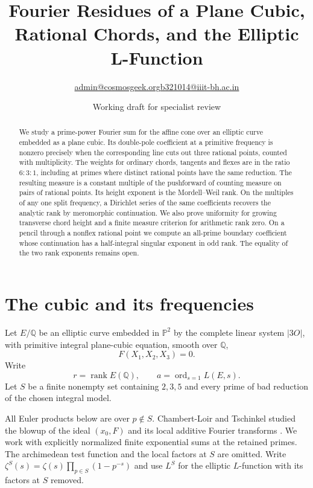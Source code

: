 \documentclass[11pt]{article}
\title{Fourier Residues of a Plane Cubic, Rational Chords, and the Elliptic L-Function}
\author{\small \href{mailto:admin@cosmosgeek.org}{admin@cosmosgeek.org}\qquad \href{mailto:b321014@iiit-bh.ac.in}{b321014@iiit-bh.ac.in}}
\date{Working draft for specialist review}
\begin{document}
\maketitle

\begin{abstract}
We study a prime-power Fourier sum for the affine cone over an elliptic
curve embedded as a plane cubic. Its double-pole coefficient at a
primitive frequency is nonzero precisely when the corresponding line
cuts out three rational points, counted with multiplicity. The weights
for ordinary chords, tangents and flexes are in the ratio $6:3:1$,
including at primes where distinct rational points have the same
reduction. The resulting measure is a constant multiple of the
pushforward of counting measure on pairs of rational points. Its
height exponent is the Mordell--Weil rank. On the multiples of any
one split frequency, a Dirichlet series of the same coefficients
recovers the analytic rank by meromorphic continuation. We also
prove uniformity for growing transverse chord height and a finite
measure criterion for arithmetic rank zero. On a pencil through a nonflex
rational point we compute an all-prime boundary coefficient whose continuation
has a half-integral singular exponent in odd rank. The equality of the two
rank exponents remains open.
\end{abstract}

\section{The cubic and its frequencies}

Let $E/\mathbb Q$ be an elliptic curve embedded in
$\mathbb P^2$ by the complete linear system $|3O|$,
with primitive integral plane-cubic equation, smooth over $\mathbb Q$,
\[
F(X_1,X_2,X_3)=0.
\]
Write
\[
r=\operatorname{rank}E(\mathbb Q),\qquad
a=\operatorname{ord}_{s=1}L(E,s).
\]
Let $S$ be a finite nonempty set containing
$2,3,5$ and every prime of bad reduction of
the chosen integral model.

All Euler products below are over $p\notin S$.
Chambert-Loir and Tschinkel studied the blowup of the ideal $(x_0,F)$
and its local additive Fourier transforms \cite[\S3]{CLT}. We work
with explicitly normalized finite exponential sums at the retained primes.
The archimedean test function and the local factors at $S$ are omitted.
Write $\zeta^S(s)=\zeta(s)\prod_{p\in S}(1-p^{-s})$ and use $L^S$
for the elliptic $L$-function with its factors at $S$ removed.
\end{document}
